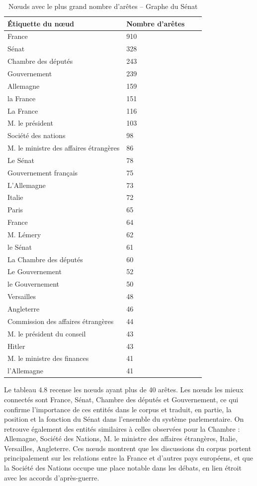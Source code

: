 \documentclass[a4paper,twoside,12pt]{book}
\begin{document}
\begin{table}[ht]
\centering
\begin{tabular}{ll@{\hskip 1cm}ll}
\hline
\textbf{Étiquette du nœud} & \textbf{Nombre d'arêtes} \\
\hline
France & 910 \\
Sénat & 328 \\
Chambre des députés & 243 \\
Gouvernement & 239 \\
Allemagne & 159 \\
la France & 151 \\
La France & 116 \\
M. le président & 103 \\
Société des nations & 98 \\
M. le ministre des affaires étrangères & 86 \\
Le Sénat & 78 \\
Gouvernement français & 75 \\
L'Allemagne & 73 \\
Italie & 72 \\
Paris & 65 \\
France  & 64 \\
M. Lémery & 62 \\
le Sénat & 61 \\
La Chambre des députés & 60 \\
Le Gouvernement & 52 \\
le Gouvernement & 50 \\
Versailles & 48 \\
Angleterre & 46 \\
Commission des affaires étrangères & 44 \\
M. le président du conseil & 43 \\
Hitler & 43 \\
M. le ministre des finances & 41 \\
l'Allemagne & 41 \\
\hline
\end{tabular}

\vspace{0.5em}
\caption{Nœuds avec le plus grand nombre d'arêtes – Graphe du Sénat}
\label{tab:node-edge-count}
\end{table}

Le tableau 4.8 recense les nœuds ayant plus de 40 arêtes. Les nœuds les mieux connectés sont France, Sénat, Chambre des députés et Gouvernement, ce qui confirme l'importance de ces entités dans le corpus et traduit, en partie, la position et la fonction du Sénat dans l'ensemble du système parlementaire. On retrouve également des entités similaires à celles observées pour la Chambre : Allemagne, Société des Nations, M. le ministre des affaires étrangères, Italie, Versailles, Angleterre. Ces nœuds montrent que les discussions du corpus portent principalement sur les relations entre la France et d'autres pays européens, et que la Société des Nations occupe une place notable dans les débats, en lien étroit avec les accords d'après-guerre.
\end{document}
